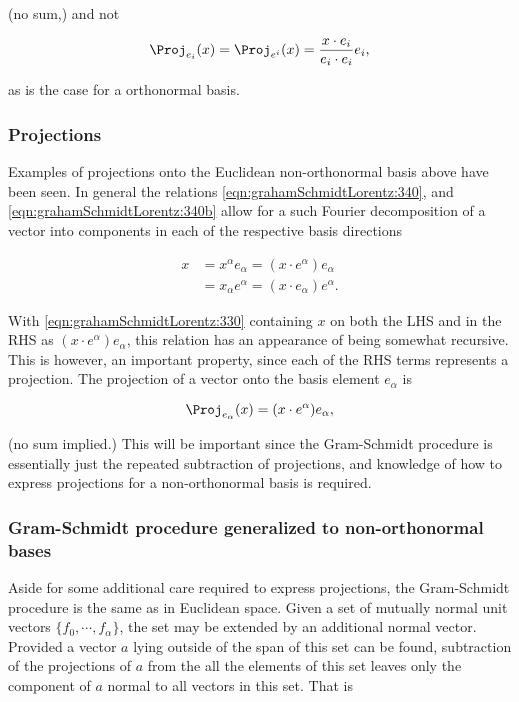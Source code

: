 (no sum,) and not 

\begin{equation}\label{eqn:grahamSchmidtLorentz:960}
\Proj_{e_i}(x) = \Proj_{e^i}(x) = \frac{x \cdot e_i}{e_i \cdot e_i} e_i,
\end{equation}

as is the case for a orthonormal basis.

\subsubsection{Projections}

Examples of projections onto the Euclidean non-orthonormal basis above have been seen.  In general the relations \ref{eqn:grahamSchmidtLorentz:340}, and \ref{eqn:grahamSchmidtLorentz:340b} allow for a such Fourier decomposition of a vector into components in each of the respective basis directions

\begin{equation}\label{eqn:grahamSchmidtLorentz:330}
\begin{aligned}
x &= x^\alpha e_\alpha = (x \cdot e^\alpha) e_\alpha \\
  &= x_\alpha e^\alpha = (x \cdot e_\alpha) e^\alpha.
\end{aligned}
\end{equation}

With \ref{eqn:grahamSchmidtLorentz:330} containing $x$ on both the LHS and in the RHS as $(x \cdot e^\alpha) e_\alpha$, this relation has an appearance of being somewhat recursive.  This is however, an important property, since each of the RHS terms represents a projection.  The projection of a vector onto the basis element $e_\alpha$ is

\begin{equation}\label{eqn:grahamSchmidtLorentz:560}
\Proj_{e_\alpha}(x) = (x \cdot e^\alpha) e_\alpha,
\end{equation}

(no sum implied.)  
This will be important since the Gram-Schmidt procedure is essentially just the repeated subtraction of projections, and knowledge of how to express projections for a non-orthonormal basis is required.

\subsubsection{Gram-Schmidt procedure generalized to non-orthonormal bases}

Aside for some additional care required to express projections, the Gram-Schmidt procedure is the same as in Euclidean space.
Given a set of mutually normal unit vectors $\{f_0, \cdots, f_\alpha\}$, the set may be extended by an additional normal vector.  Provided a vector $a$ lying outside of the span of this set can be found, subtraction of the projections of $a$ from the all the elements of this set leaves only the component of $a$ normal to all vectors in this set.  That is

